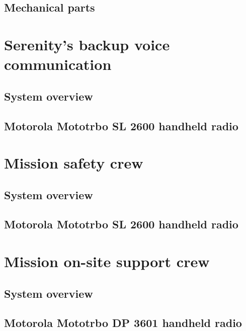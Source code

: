 \subsection{Mechanical parts}

\section{Serenity's backup voice communication}
\subsection{System overview}
\subsection{Motorola Mototrbo SL 2600 handheld radio}

\section{Mission safety crew}
\subsection{System overview}
\subsection{Motorola Mototrbo SL 2600 handheld radio}

\section{Mission on-site support crew}
\subsection{System overview}
\subsection{Motorola Mototrbo DP 3601 handheld radio}